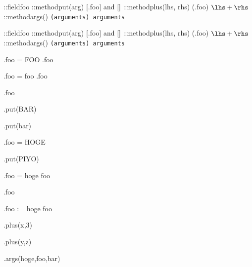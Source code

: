 \documentclass{jarticle}
\begin{document}
\def\describe#1{\texttt{(#1) \expandafter\meaning\csname #1\endcsname}}

\def\constructor#1{
  \def#1{}
  \object::field#1{foo}
  \object::method#1put(arg) {
    [\this.foo] and [\arg]
  }
  \object::method#1plus(lhs, rhs) {
    (\this.foo) $\lhs+\rhs$
  }
  \object::method#1args() {
    \describe{arguments}
  }
}

\constructor\obj
\constructor\obk

\obj.foo = {FOO}
\obj.foo

\obk.foo = {foo}
\obk.foo

\obj.foo

\obj.put(BAR)

\obk.put(bar)

\obj.foo = {HOGE}

\obj.put(PIYO)

\def\tmp{hoge foo}

\obj.foo = \tmp

\obj.foo

\obj.foo := \tmp

\obj.plus(x,3)

\obk.plus(y,z)

\obj.args(hoge,foo,bar)
\end{document}
